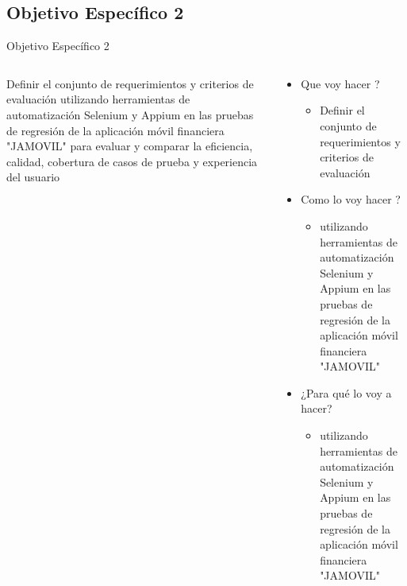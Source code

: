 \documentclass{beamer}
\begin{document}
\subsection{Objetivo Específico 2 }
\begin{frame}{Objetivo Específico 2 }
  \begin{columns}
    \begin{column}{0.5\textwidth}
     Definir el conjunto de requerimientos y criterios de evaluación utilizando herramientas de automatización Selenium y Appium en las pruebas de regresión de la aplicación móvil financiera "JAMOVIL" para evaluar y comparar la eficiencia, calidad, cobertura de casos de prueba y experiencia del usuario 
    \end{column}
    \begin{column}{0.5\textwidth}
      \begin{itemize}
          \item Que voy hacer ?
          \begin{itemize}
              \item Definir el conjunto de requerimientos y criterios de evaluación
          \end{itemize}
          \item Como lo voy hacer ?
          \begin{itemize}
              \item utilizando herramientas de automatización Selenium y Appium en las pruebas de regresión de la aplicación móvil financiera "JAMOVIL"
          \end{itemize}
          \item ¿Para qué lo voy a hacer?
          \begin{itemize}
                  \item utilizando herramientas de automatización Selenium y Appium en las pruebas de regresión de la aplicación móvil financiera "JAMOVIL"
          \end{itemize}
      \end{itemize}
    \end{column}
  \end{columns}
\end{frame}
\end{document}

